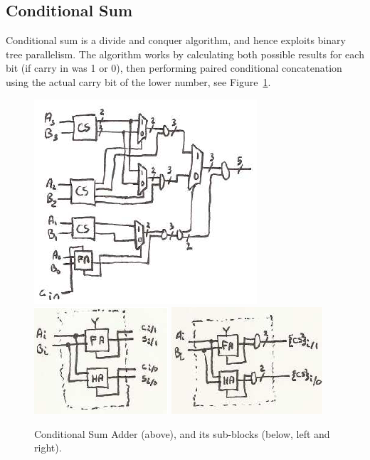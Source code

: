 \subsection{Conditional Sum}
Conditional sum is a divide and conquer algorithm, and hence exploits binary tree parallelism.  The algorithm works by calculating both possible results for each bit (if carry in was 1 or 0), then performing paired conditional concatenation using the actual carry bit of the lower number, see Figure~\ref{f-cond_sum_add}.

\begin{figure}
\caption{Conditional Sum Adder (above), and its sub-blocks (below, left and right).}\label{f-cond_sum_add}
\begin{center}
\includegraphics{conditional_sum.png}\\\vspace{.2in}
\includegraphics{cs_4out.png} \hspace{.2in} \includegraphics{cs_2out.png}
\end{center}
\end{figure}

